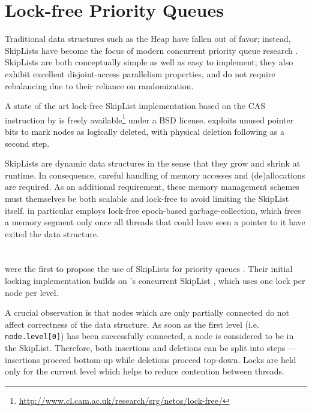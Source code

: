 \section{Lock-free Priority Queues} \label{sec:lockfree}

Traditional data structures such as the Heap have fallen out of favor;
instead, SkipLists \cite{pugh1990skip,pugh1998concurrent} have become the focus
of modern concurrent priority queue research
\cite{shavit2000skiplist,sundell2003fast,herlihy2012art,linden2013skiplist,alistarhspraylist}.
SkipLists are both conceptually simple as well as easy to implement; they also exhibit
excellent disjoint-access parallelism properties, and do not require rebalancing due to their
reliance on randomization.

A state of the art lock-free SkipList implementation based on the \ac{CAS} instruction
by \citeauthor{fraser2004practical} \cite{fraser2004practical} is freely available\footnote{
\url{http://www.cl.cam.ac.uk/research/srg/netos/lock-free/}} under a BSD license.
\citeauthor{fraser2004practical} exploits unused pointer bits to mark nodes as logically
deleted, with physical deletion following as a second step.

SkipLists are dynamic data structures in the sense that they grow and shrink
at runtime. In consequence, careful handling of memory accesses and (de)allocations
are required. As an additional requirement, these memory management schemes must
themselves be both scalable and lock-free to avoid limiting the SkipList itself.
\citeauthor{fraser2004practical} in particular employs lock-free epoch-based garbage-collection,
which frees a memory segment only once all threads that could have seen a pointer to it have
exited the data structure.


\section{\citeauthor{shavit2000skiplist}} \label{sec:shavit}

\citeauthor{shavit2000skiplist} were the first to propose the use of SkipLists
for priority queues \cite{linden2013skiplist}. Their initial locking implementation
\cite{shavit2000skiplist} builds on \citeauthor{pugh1998concurrent}'s concurrent
SkipList \cite{pugh1998concurrent}, which uses one lock per node per level.

A crucial observation is that nodes which are only partially connected
do not affect correctness of the data structure. As soon as the first level (i.e. \lstinline|node.level[0]|)
has been successfully connected, a node is considered to be in the SkipList.
Therefore, both insertions and deletions can be split into steps --- insertions
proceed bottom-up while deletions proceed top-down. Locks are held only for the current level
which helps to reduce contention between threads.

